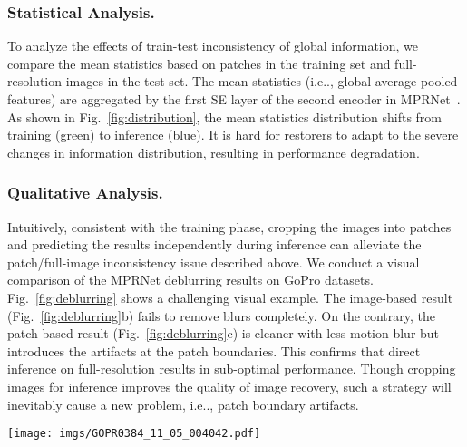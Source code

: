 \documentclass[runningheads]{llncs}
\makeatletter
\DeclareRobustCommand\onedot{\futurelet\@let@token\@onedot}
\def\@onedot{\ifx\@let@token.\else.\null\fi\xspace}
\def\ie{i.e\onedot}
\makeatother
\begin{document}
\subsubsection{Statistical Analysis.}
To analyze the effects of train-test inconsistency of global information, we compare the mean statistics based on patches in the training set and full-resolution images in the test set. The mean statistics (\ie, global average-pooled features) are aggregated by the first SE layer of the second encoder in MPRNet~\cite{Zamir2021MPRNet}. As shown in Fig.~\ref{fig:distribution}, the mean statistics distribution shifts from training (green) to inference (blue).
It is hard for restorers to adapt to the severe changes in information distribution, resulting in performance degradation.


\subsubsection{Qualitative Analysis.}
Intuitively, consistent with the training phase, cropping the images into patches and predicting the results independently during inference can alleviate the patch/full-image inconsistency issue described above. We conduct a visual comparison of the MPRNet deblurring results on GoPro datasets. 
Fig.~\ref{fig:deblurring} shows a challenging visual example.
The image-based result (Fig.~\ref{fig:deblurring}b) fails to remove blurs completely. On the contrary, the patch-based result (Fig.~\ref{fig:deblurring}c) is cleaner with less motion blur but introduces the artifacts at the patch boundaries. This confirms that direct inference on full-resolution results in sub-optimal performance. 
Though cropping images for inference improves the quality of image recovery, such a strategy will inevitably cause a new problem, \ie, patch boundary artifacts. 

\begin{figure*}[t]
\centering

\texttt{[image: imgs/GOPR0384\_11\_05\_004042.pdf]}
\caption{
Visual comparison with different test-time methods to MPRNet~\cite{zamir2021multi} for image deblurring.
(a) Blurry image;
(b) Inference with image;
(c) Inference with cropped patches;
(d) Ours: TLC is adopted and inference based on images. 
Our TLC generates sharp image without boundary artifacts in (b).
}
\label{fig:deblurring}
\end{figure*}
\end{document}
